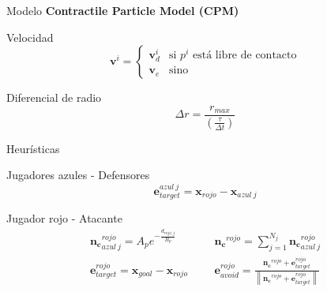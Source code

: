 \begin{frame}{Modelo}
    \textbf{\large{Contractile Particle Model (CPM)}}
    \begin{block}{Velocidad}
        \begin{equation*}
            \mathbf{v}^i = \begin{cases}
                \mathbf{v}_d^i & \text{si $p^i$ está libre de contacto} \\
                \mathbf{v}_e & \text{sino}
            \end{cases}
        \end{equation*}
    \end{block}
    \begin{block}{Diferencial de radio}
        \begin{equation*}
            \Delta r = \frac{r_{max}}{\left( \frac{\tau}{\Delta t} \right)}
        \end{equation*}
    \end{block}
\end{frame}

\begin{frame}{Heurísticas}
    \begin{block}{Jugadores azules - Defensores}
        \small{}
        \begin{equation*}
            \mathbf{e}_{target}^{azul\ j} = \mathbf{x}_{rojo} - \mathbf{x}_{azul\ j}
        \end{equation*}
    \end{block}
    \begin{block}{Jugador rojo - Atacante}
        \small{
        }
        \begin{equation*}
            \begin{aligned}
                \mathbf{n_c}_{azul\ j}^{rojo} = A_p e^{-\frac{d_{rojo,j}}{B_p}} &&& \mathbf{n_c}^{rojo} = \sum_{j=1}^{N_j} \mathbf{n_c}_{azul\ j}^{rojo} \\
                \mathbf{e}_{target}^{rojo} = \mathbf{x}_{goal} - \mathbf{x}_{rojo} &&& \mathbf{e}_{avoid}^{rojo} = \frac{\mathbf{n_c}^{rojo} + \mathbf{e}_{target}^{rojo}}{\left\| \mathbf{n_c}^{rojo} + \mathbf{e}_{target}^{rojo} \right\|}
            \end{aligned}
        \end{equation*}
    \end{block}
\end{frame}




